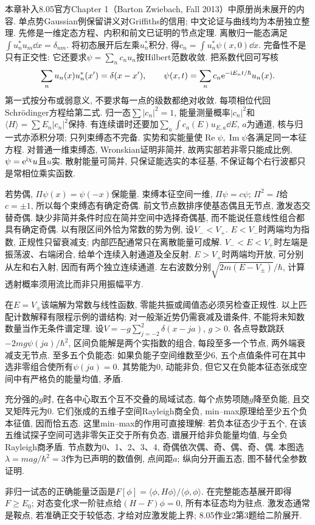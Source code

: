 本章补入8.05官方Chapter 1（Barton Zwiebach, Fall 2013）中原册尚未展开的内容. 单点势Gaussian例保留讲义对Griffiths的信用; 中文论证与曲线均为本册独立整理. 先修是一维定态方程、内积和前文已证明的节点定理.
离散归一能态满足$\int u_n^*u_m\dd x=\delta_{nm}$. 将初态展开后左乘$u_n^*$积分, 得$c_n=\int u_n^*\psi(x,0)\dd x$. 完备性不是只有正交性: 它还要求$\psi=\sum_nc_nu_n$按Hilbert范数收敛. 把系数代回可写核
\[
\sum_nu_n(x)u_n^*(x')=\delta(x-x'),\qquad
\psi(x,t)=\sum_nc_n\mathrm e^{-\mathrm i E_nt/\hbar}u_n(x).
\]
第一式按分布或弱意义, 不要求每一点的级数都绝对收敛. 每项相位代回Schrödinger方程给第二式. 归一态$\sum|c_n|^2=1$, 能量测量概率$|c_n|^2$和$\langle H\rangle=\sum E_n|c_n|^2$保持. 有连续谱时还要加$\sum_a\int c_a(E)u_{E,a}\dd E$, $a$为通道, 核与归一式亦添积分项; 只列束缚态不完备.
实势和实能量使$\operatorname{Re}\psi,\operatorname{Im}\psi$各满足同一本征方程. 对普通一维束缚态, Wronskian证明非简并, 故两实部若非零只能成比例, $\psi=\mathrm e^{\mathrm i\chi}u$且$u$实. 散射能量可简并, 只保证能选实的本征基, 不保证每个右行波都只是常相位乘实函数.

若势偶, $\Pi\psi(x)=\psi(-x)$保能量. 束缚本征空间一维, $\Pi\psi=c\psi$; $\Pi^2=I$给$c=\pm1$, 所以每个束缚态有确定奇偶. 前文节点数排序使基态偶且无节点, 激发态交替奇偶. 缺少非简并条件时应在简并空间中选择奇偶基, 而不能说任意线性组合都具有确定奇偶.
以有限区间外恰为常数的势为例, 设$V_-<V_+$. $E<V_-$时两端均为指数, 正规性只留衰减支; 内部匹配通常只在离散能量可成解. $V_-<E<V_+$时左端是振荡波、右端闭合, 给单个连续入射通道及全反射. $E>V_+$时两端均开放, 可分别从左和右入射, 因而有两个独立连续通道. 左右波数分别$\sqrt{2m(E-V_\pm)}/\hbar$, 计算透射概率须用流比而非只用振幅平方.

在$E=V_\pm$该端解为常数与线性函数, 零能共振或阈值态必须另检查正规性. 以上匹配计数解释有限程示例的谱结构; 对一般渐近势仍需衰减及谱条件, 不能将未知数数量当作无条件谱定理.
设$V=-g\sum_{j=-2}^2\delta(x-ja)$, $g>0$. 各点导数跳跃$-2mg\psi(ja)/\hbar^2$, 区间负能解是两个实指数的组合, 每段至多一个节点, 两外端衰减支无节点. 至多五个负能态: 如果负能子空间维数至少6, 五个点值条件可在其中选非零组合使所有$\psi(ja)=0$. 其势能为0, 动能非负, 但它又在负能本征态张成空间中有严格负的能量均值, 矛盾.

充分强的$g$时, 在各中心取五个互不交叠的局域试态, 每个点势项随$g$降至负能, 且交叉矩阵元为0. 它们张成的五维子空间Rayleigh商全负, min--max原理给至少五个负本征值, 因而恰五态. 这里min--max的作用可直接理解: 若负本征态少于五个, 在该五维试探子空间可选非零矢正交于所有负态, 谱展开给非负能量均值, 与全负Rayleigh商矛盾. 节点数为0、1、2、3、4, 奇偶依次偶、奇、偶、奇、偶. 本图选$\lambda=mag/\hbar^2=3$作为已声明的数值例, 点间距$a$; 纵向分开画五态, 图不替代全参数证明.

非归一试态的正确能量泛函是$F[\phi]=\langle\phi,H\phi\rangle/\langle\phi,\phi\rangle$. 在完整能态基展开即得$F\ge E_0$; 对态变化求一阶驻点给$(H-F)\phi=0$, 所有本征态均为驻点. 激发态通常是鞍点, 若准确正交于较低态, 才给对应激发能上界; 8.05作业2第3题给二阶展开.

